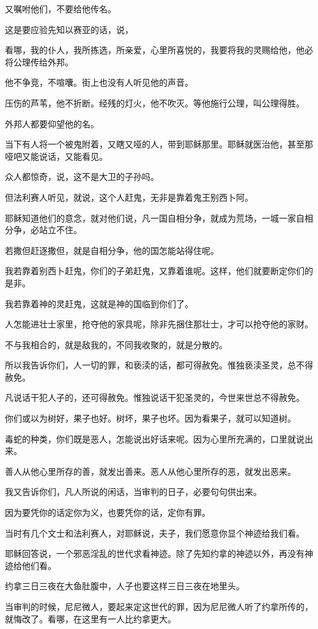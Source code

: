\documentclass[12pt,oneside]{book}
\begin{document}
又嘱咐他们，不要给他传名。

这是要应验先知以赛亚的话，说，

看哪，我的仆人，我所拣选，所亲爱，心里所喜悦的，我要将我的灵赐给他，他必将公理传给外邦。

他不争竞，不喧囔。街上也没有人听见他的声音。

压伤的芦苇，他不折断。经残的灯火，他不吹灭。等他施行公理，叫公理得胜。

外邦人都要仰望他的名。

当下有人将一个被鬼附着，又瞎又哑的人，带到耶稣那里。耶稣就医治他，甚至那哑吧又能说话，又能看见。

众人都惊奇，说，这不是大卫的子孙吗。

但法利赛人听见，就说，这个人赶鬼，无非是靠着鬼王别西卜阿。

耶稣知道他们的意念，就对他们说，凡一国自相分争，就成为荒场，一城一家自相分争，必站立不住。

若撒但赶逐撒但，就是自相分争，他的国怎能站得住呢。

我若靠着别西卜赶鬼，你们的子弟赶鬼，又靠着谁呢。这样，他们就要断定你们的是非。

我若靠着神的灵赶鬼，这就是神的国临到你们了。

人怎能进壮士家里，抢夺他的家具呢，除非先捆住那壮士，才可以抢夺他的家财。

不与我相合的，就是敌我的，不同我收聚的，就是分散的。

所以我告诉你们，人一切的罪，和亵渎的话，都可得赦免。惟独亵渎圣灵，总不得赦免。

凡说话干犯人子的，还可得赦免。惟独说话干犯圣灵的，今世来世总不得赦免。

你们或以为树好，果子也好。树坏，果子也坏。因为看果子，就可以知道树。

毒蛇的种类，你们既是恶人，怎能说出好话来呢。因为心里所充满的，口里就说出来。

善人从他心里所存的善，就发出善来。恶人从他心里所存的恶，就发出恶来。

我又告诉你们，凡人所说的闲话，当审判的日子，必要句句供出来。

因为要凭你的话定你为义，也要凭你的话，定你有罪。

当时有几个文士和法利赛人，对耶稣说，夫子，我们愿意你显个神迹给我们看。

耶稣回答说，一个邪恶淫乱的世代求看神迹。除了先知约拿的神迹以外，再没有神迹给他们看。

约拿三日三夜在大鱼肚腹中，人子也要这样三日三夜在地里头。

当审判的时候，尼尼微人，要起来定这世代的罪，因为尼尼微人听了约拿所传的，就悔改了。看哪，在这里有一人比约拿更大。
\end{document}
